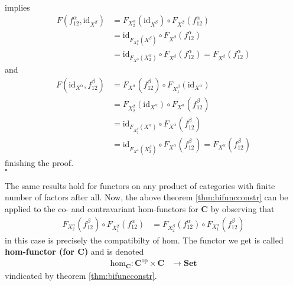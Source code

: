 \begin{prf}
\begin{align*}
\end{align*}
implies
\begin{align*}
  F(f_{12}^{\alpha},\mathrm{id}_{X^{\beta}})
  &=
  F_{X_{2}^{\alpha}}(\mathrm{id}_{X^{\beta}})
  \circ
  F_{X^{\beta}}(f_{12}^{\alpha})
  \\
  &=
  \mathrm{id}_{F_{X_{2}^{\alpha}}(X^{\beta})}
  \circ
  F_{X^{\beta}}(f_{12}^{\alpha})
  \\
  &=
  \mathrm{id}_{F_{X^{\beta}}(X_{2}^{\alpha})}
  \circ
  F_{X^{\beta}}(f_{12}^{\alpha})
  =
  F_{X^{\beta}}(f_{12}^{\alpha})
\end{align*}
and
\begin{align*}
  F(\mathrm{id}_{X^{\alpha}},f_{12}^{\beta})
  &=
  F_{X^{\alpha}}(f_{12}^{\beta})
  \circ
  F_{X_{1}^{\beta}}(\mathrm{id}_{X^{\alpha}})
  \\
  &=
  F_{X_{2}^{\beta}}(\mathrm{id}_{X^{\alpha}})
  \circ
  F_{X^{\alpha}}(f_{12}^{\beta})
  \\
  &=
  \mathrm{id}_{F_{X_{2}^{\beta}}(X^{\alpha})}
  \circ
  F_{X^{\alpha}}(f_{12}^{\beta})
  \\
  &=
  \mathrm{id}_{F_{X^{\alpha}}(X_{2}^{\beta})}
  \circ
  F_{X^{\alpha}}(f_{12}^{\beta})
  =
  F_{X^{\alpha}}(f_{12}^{\beta})
\end{align*}
finishing the proof.
\\
\phantom{proven}
\hfill
$\square$
\end{prf}
The same results hold for functors on any product of categories with finite number of factors after all. Now, the above theorem \ref{thm:bifuncconstr} can be applied to the co- and contravariant hom-functors for $\mathbf{C}$ by observing that
\begin{align*}
  F_{X_{2}^{\alpha}}(f_{12}^{\beta})
  \circ
  F_{X_{1}^{\beta}}(f_{12}^{\alpha})
  &=
  F_{X_{2}^{\beta}}(f_{12}^{\alpha})
  \circ
  F_{X_{1}^{\alpha}}(f_{12}^{\beta})
\end{align*}
in this case is precisely the compatibilty of hom. The functor we get is called \textbf{hom-functor (for $\mathbf{C}$)} and is denoted
\begin{align*}
  \mathrm{hom}_{\mathbf{C}}
  \colon
  \mathbf{C}^{\mathrm{op}}
  \times
  \mathbf{C}
  &\rightarrow
  \mathbf{Set}
\end{align*}
vindicated by theorem \ref{thm:bifuncconstr}.
